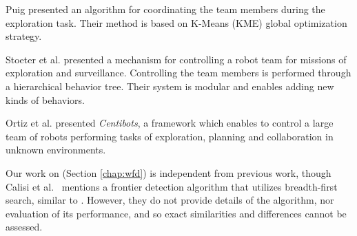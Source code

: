 Puig \cite{puig2010balanced} presented an algorithm for coordinating the
team members during the exploration task. Their method is based on K-Means (KME) global
optimization strategy. 

Stoeter et al. \cite{stoeter2000robot} presented a mechanism for controlling
a robot team for missions of exploration and surveillance. Controlling the team
members is performed through a hierarchical behavior tree. Their system is
modular and enables adding new kinds of behaviors. 

Ortiz et al. \cite{konolige2003large,konolige2006centibots} presented
\emph{Centibots}, a framework which enables to control a large team of robots performing tasks of
exploration, planning and collaboration in unknown environments.   

Our work on \WFD (Section \ref{chap:wfd}) is independent from previous work,
though Calisi et al.~\cite{calisi2007multi} mentions a frontier detection algorithm that utilizes breadth-first search, similar to \WFD.
However, they do not provide details of the
algorithm, nor evaluation of its performance, and so exact similarities and
differences cannot be assessed.